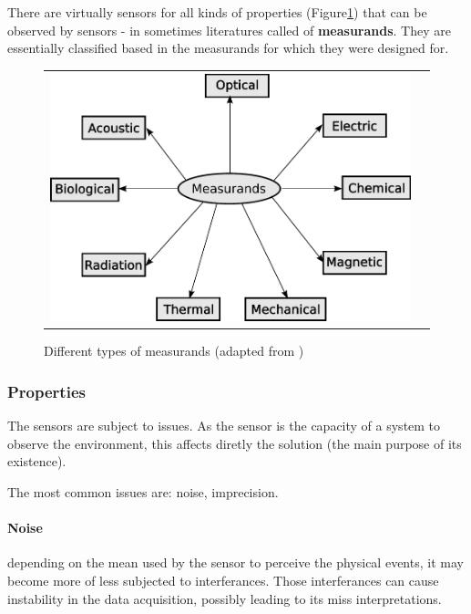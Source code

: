 There are virtually sensors for all kinds of properties (Figure\ref{fig:sensors}) that can be observed by sensors - in sometimes literatures called of \textbf{measurands}. They are essentially classified based in the measurands for which they were designed for.

\begin{figure}[h]
   \centering
     \begin{tabular}{lr}
       \includegraphics[scale=0.50]{img/fig:sensors}
     \end{tabular}
   \caption{Different types of measurands (adapted from \cite{WhiteRichard})}
   \label{fig:sensors}
 \end{figure}

\subsubsection{Properties}

The sensors are subject to issues. As the sensor is the capacity of a system to observe the environment, this affects diretly the solution (the main purpose of its existence).

The most common issues are: noise, imprecision. 

\paragraph{Noise} depending on the mean used by the sensor to perceive the physical events, it may become more of less subjected to interferances. Those interferances can cause instability in the data acquisition, possibly leading to its miss interpretations.

